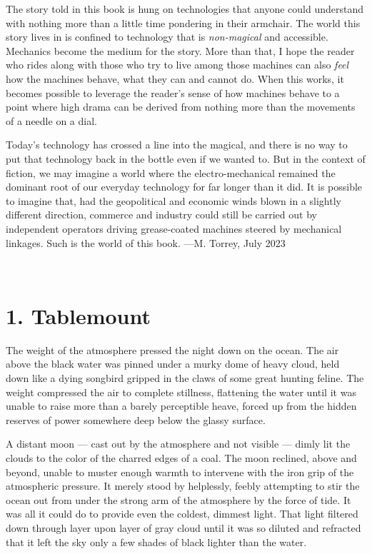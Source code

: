 \documentclass[
]{scrbook}
\begin{document}
The story told in this book is hung on technologies that anyone could
understand with nothing more than a little time pondering in their
armchair. The world this story lives in is confined to technology that
is \emph{non-magical} and accessible. Mechanics become the medium for
the story. More than that, I hope the reader who rides along with those
who try to live among those machines can also \emph{feel} how the
machines behave, what they can and cannot do. When this works, it
becomes possible to leverage the reader's sense of how machines behave
to a point where high drama can be derived from nothing more than the
movements of a needle on a dial.

Today's technology has crossed a line into the magical, and there is no
way to put that technology back in the bottle even if we wanted to. But
in the context of fiction, we may imagine a world where the
electro-mechanical remained the dominant root of our everyday technology
for far longer than it did. It is possible to imagine that, had the
geopolitical and economic winds blown in a slightly different direction,
commerce and industry could still be carried out by independent
operators driving grease-coated machines steered by mechanical linkages.
Such is the world of this book.  ---M. Torrey, July 2023


\newpage

\ %

\newpage

\hypertarget{tablemount}{%
\section{1. Tablemount}\label{tablemount}}

The weight of the atmosphere pressed the night down on the ocean. The
air above the black water was pinned under a murky dome of heavy cloud,
held down like a dying songbird gripped in the claws of some great
hunting feline. The weight compressed the air to complete stillness,
flattening the water until it was unable to raise more than a barely
perceptible heave, forced up from the hidden reserves of power somewhere
deep below the glassy surface.

A distant moon --- cast out by the atmosphere and not visible --- dimly
lit the clouds to the color of the charred edges of a coal. The moon
reclined, above and beyond, unable to muster enough warmth to intervene
with the iron grip of the atmospheric pressure. It merely stood by
helplessly, feebly attempting to stir the ocean out from under the
strong arm of the atmosphere by the force of tide. It was all it could
do to provide even the coldest, dimmest light. That light filtered down
through layer upon layer of gray cloud until it was so diluted and
refracted that it left the sky only a few shades of black lighter than
the water.
\end{document}
